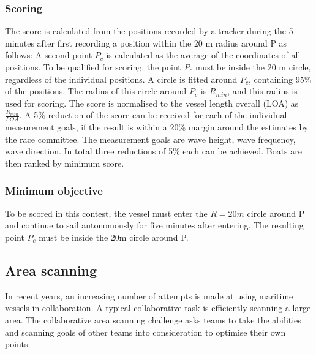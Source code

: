 \documentclass[12pt]{article}
\begin{document}
\subsubsection{Scoring}
The score is calculated from the positions recorded by a tracker during the 5
minutes after first recording a position within the 20 m radius around P as
follows:
A second point $P_c$ is calculated as the average of the coordinates of all
positions. To be qualified for scoring, the point $P_c$ must be
inside the 20 m circle, regardless of the individual positions.
A circle is fitted around $P_c$, containing 95\% of the positions.
The radius of this circle around $P_c$ is $R_{min}$, and this radius is used for
scoring. The score is normalised to the vessel length overall (LOA) as 
$\frac{R_{min}}{LOA}$. 
A 5\% reduction of the score can be received for each of the individual
measurement goals, if the result is within a 20\% margin around 
the estimates by the race committee. The measurement goals are
wave height, wave frequency, wave direction. In total three reductions of 5\%
each can be achieved. Boats are then ranked by minimum score.

\subsubsection{Minimum objective}
To be scored in this contest, the vessel must enter the $R=20m$ circle around P
and continue to sail autonomously for five minutes after entering. The resulting 
point $P_c$ must be inside the 20m circle around P.

\subsection{Area scanning}
In recent years, an increasing number of attempts is made at using maritime
vessels in collaboration. A typical
collaborative task is efficiently scanning a large area.
The collaborative area scanning challenge asks teams to take the abilities and
scanning goals of other teams into consideration to optimise their own points.
\end{document}
